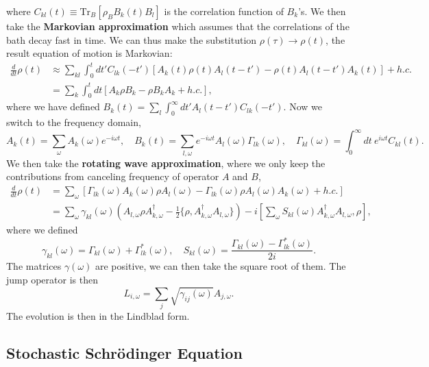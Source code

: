 \documentclass[aps,prx,superscriptaddress,nofootinbib]{revtex4}
\begin{document}
where $C_{kl}(t) \equiv \mathrm{Tr}_B[\rho_B B_k(t) B_l ]$ is the correlation function of $B_k$'s.  We then take the \textbf{Markovian approximation} which assumes that the correlations of the bath decay fast in time. We can thus make the substitution $\rho(\tau) \rightarrow \rho(t)$, the result equation of motion is Markovian:
\begin{equation*}
\begin{aligned}
	\frac{d}{dt} \rho(t) &\approx \sum_{kl}\int_{0}^{t}dt' C_{lk}(-t') \left[A_k(t)\rho(t)A_l(t-t')-\rho(t)A_l(t-t')A_k(t)\right]+h.c. \\
	&= \sum_{k} \int_0^t dt \left[A_k \rho B_{k}-\rho B_{k} A_k+h.c.\right],
\end{aligned}
\end{equation*}
where we have defined $B_{k}(t) = \sum_l \int_0^{\infty} dt' A_l(t-t')C_{lk}(-t')$. Now we switch to the frequency domain,
$$
	A_k(t) = \sum_\omega A_{k}(\omega) e^{-i\omega t}, \quad
	B_k(t) = \sum_{l,\omega} e^{-i\omega t} A_l(\omega)\Gamma_{lk}(\omega), \quad
	\Gamma_{kl}(\omega) = \int_0^\infty dt\ e^{i\omega t}C_{kl}(t).
$$
We then take the \textbf{rotating wave approximation}, where we only keep the contributions from canceling frequency of operator $A$ and $B$,
\begin{equation}
\begin{aligned}
	\frac{d}{dt}\rho(t) &= \sum_{\omega} \left[\Gamma_{lk}(\omega) A_k(\omega) \rho A_l(\omega) - \Gamma_{lk}(\omega)\rho A_l(\omega) A_k(\omega) + h.c. \right] \\
	&= \sum_{\omega} \gamma_{kl}(\omega)(A_{l,\omega}\rho A_{k,\omega}^\dagger-\frac{1}{2}\{\rho,A_{k,\omega}^\dagger A_{l,\omega}\}) -i\left[\sum_{\omega}S_{kl}(\omega)A_{k,\omega}^\dagger A_{l,\omega},\rho\right],
\end{aligned}
\end{equation}
where we defined
$$
\gamma_{kl}(\omega) = \Gamma_{kl}(\omega) +\Gamma^*_{lk}(\omega), \quad
S_{kl}(\omega) = \frac{\Gamma_{kl}(\omega) - \Gamma^*_{lk}(\omega)}{2i}.
$$
The matrices $\gamma(\omega)$ are positive, we can then take the square root of them. The jump operator is then 
$$L_{i,\omega} = \sum_j \sqrt{\gamma_{ij}(\omega)}A_{j,\omega}.$$ 
The evolution is then in the Lindblad form.



\subsection{Stochastic Schr\"{o}dinger Equation}
\end{document}
